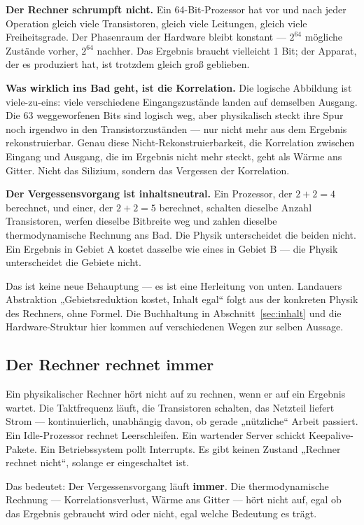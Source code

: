 \LB \textbf{Der Rechner schrumpft nicht.} Ein 64-Bit-Prozessor hat vor und nach
jeder Operation gleich viele Transistoren, gleich viele Leitungen, gleich viele
Freiheitsgrade. Der Phasenraum der Hardware bleibt konstant --- $2^{64}$ mögliche
Zustände vorher, $2^{64}$ nachher. Das Ergebnis braucht vielleicht 1 Bit; der
Apparat, der es produziert hat, ist trotzdem gleich groß geblieben.

\LB \textbf{Was wirklich ins Bad geht, ist die Korrelation.} Die logische
Abbildung ist viele-zu-eins: viele verschiedene Eingangszustände landen auf
demselben Ausgang. Die 63 weggeworfenen Bits sind logisch weg, aber physikalisch
steckt ihre Spur noch irgendwo in den Transistorzuständen --- nur nicht mehr aus
dem Ergebnis rekonstruierbar. Genau diese Nicht-Rekonstruierbarkeit, die
Korrelation zwischen Eingang und Ausgang, die im Ergebnis nicht mehr steckt, geht
als Wärme ans Gitter. Nicht das Silizium, sondern das Vergessen der Korrelation.

\LB \textbf{Der Vergessensvorgang ist inhaltsneutral.} Ein Prozessor, der
$2+2=4$ berechnet, und einer, der $2+2=5$ berechnet, schalten dieselbe Anzahl
Transistoren, werfen dieselbe Bitbreite weg und zahlen dieselbe thermodynamische
Rechnung ans Bad. Die Physik unterscheidet die beiden nicht. Ein Ergebnis in
Gebiet A kostet dasselbe wie eines in Gebiet B --- die Physik unterscheidet die
Gebiete nicht.

Das ist keine neue Behauptung --- es ist eine Herleitung von unten. Landauers
Abstraktion „Gebietsreduktion kostet, Inhalt egal“ folgt aus der konkreten Physik
des Rechners, ohne Formel. Die Buchhaltung in Abschnitt~\ref{sec:inhalt} und die
Hardware-Struktur hier kommen auf verschiedenen Wegen zur selben Aussage.

\subsection{Der Rechner rechnet immer}
\label{sec:immer}

Ein physikalischer Rechner hört nicht auf zu rechnen, wenn er auf ein Ergebnis
wartet. Die Taktfrequenz läuft, die Transistoren schalten, das Netzteil liefert
Strom --- kontinuierlich, unabhängig davon, ob gerade „nützliche“ Arbeit
passiert. Ein Idle-Prozessor rechnet Leerschleifen. Ein wartender Server schickt
Keepalive-Pakete. Ein Betriebssystem pollt Interrupts. Es gibt keinen Zustand
„Rechner rechnet nicht“, solange er eingeschaltet ist.

Das bedeutet: Der Vergessensvorgang läuft \textbf{immer}. Die thermodynamische
Rechnung --- Korrelationsverlust, Wärme ans Gitter --- hört nicht auf, egal ob das
Ergebnis gebraucht wird oder nicht, egal welche Bedeutung es trägt.

